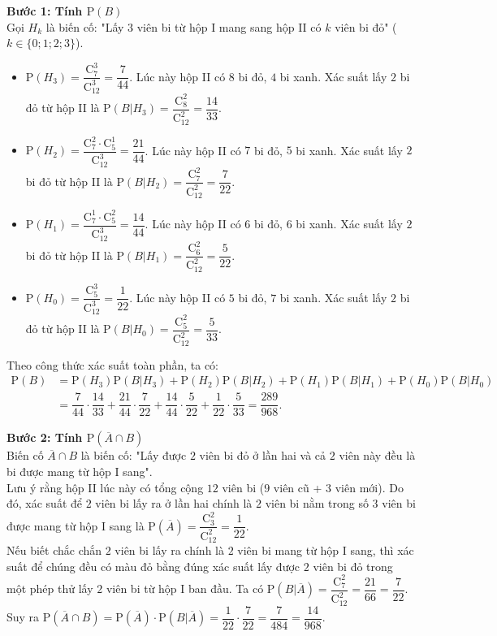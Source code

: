 \begin{ex}
{		\noindent\textbf{Bước 1: Tính $\mathrm{P}(B)$}\\
		Gọi $H_k$ là biến cố: "Lấy $3$ viên bi từ hộp I mang sang hộp II có $k$ viên bi đỏ" ($k \in \{0; 1; 2; 3\}$).
		\begin{itemize}
			\item $\mathrm{P}(H_3) = \dfrac{\mathrm{C}_7^3}{\mathrm{C}_{12}^3} = \dfrac{7}{44}$. Lúc này hộp II có $8$ bi đỏ, $4$ bi xanh. Xác suất lấy $2$ bi đỏ từ hộp II là $\mathrm{P}(B|H_3) = \dfrac{\mathrm{C}_8^2}{\mathrm{C}_{12}^2} = \dfrac{14}{33}$.
			\item $\mathrm{P}(H_2) = \dfrac{\mathrm{C}_7^2 \cdot \mathrm{C}_5^1}{\mathrm{C}_{12}^3} = \dfrac{21}{44}$. Lúc này hộp II có $7$ bi đỏ, $5$ bi xanh. Xác suất lấy $2$ bi đỏ từ hộp II là $\mathrm{P}(B|H_2) = \dfrac{\mathrm{C}_7^2}{\mathrm{C}_{12}^2} = \dfrac{7}{22}$.
			\item $\mathrm{P}(H_1) = \dfrac{\mathrm{C}_7^1 \cdot \mathrm{C}_5^2}{\mathrm{C}_{12}^3} = \dfrac{14}{44}$. Lúc này hộp II có $6$ bi đỏ, $6$ bi xanh. Xác suất lấy $2$ bi đỏ từ hộp II là $\mathrm{P}(B|H_1) = \dfrac{\mathrm{C}_6^2}{\mathrm{C}_{12}^2} = \dfrac{5}{22}$.
			\item $\mathrm{P}(H_0) = \dfrac{\mathrm{C}_5^3}{\mathrm{C}_{12}^3} = \dfrac{1}{22}$. Lúc này hộp II có $5$ bi đỏ, $7$ bi xanh. Xác suất lấy $2$ bi đỏ từ hộp II là $\mathrm{P}(B|H_0) = \dfrac{\mathrm{C}_5^2}{\mathrm{C}_{12}^2} = \dfrac{5}{33}$.
		\end{itemize}
		Theo công thức xác suất toàn phần, ta có:
		\allowdisplaybreaks
		\begin{align*}
			\mathrm{P}(B) &= \mathrm{P}(H_3)\mathrm{P}(B|H_3) + \mathrm{P}(H_2)\mathrm{P}(B|H_2) + \mathrm{P}(H_1)\mathrm{P}(B|H_1) + \mathrm{P}(H_0)\mathrm{P}(B|H_0) \\
			&= \dfrac{7}{44} \cdot \dfrac{14}{33} + \dfrac{21}{44} \cdot \dfrac{7}{22} + \dfrac{14}{44} \cdot \dfrac{5}{22} + \dfrac{1}{22} \cdot \dfrac{5}{33} = \dfrac{289}{968}.
		\end{align*}
		
		\noindent\textbf{Bước 2: Tính $\mathrm{P}(\overline{A} \cap B)$}\\
		Biến cố $\overline{A} \cap B$ là biến cố: "Lấy được $2$ viên bi đỏ ở lần hai và cả $2$ viên này đều là bi được mang từ hộp I sang".\\
		Lưu ý rằng hộp II lúc này có tổng cộng $12$ viên bi ($9$ viên cũ + $3$ viên mới). Do đó, xác suất để $2$ viên bi lấy ra ở lần hai chính là $2$ viên bi nằm trong số $3$ viên bi được mang từ hộp I sang là $\mathrm{P}(\overline{A}) = \dfrac{\mathrm{C}_3^2}{\mathrm{C}_{12}^2} = \dfrac{1}{22}$.\\
		Nếu biết chắc chắn $2$ viên bi lấy ra chính là $2$ viên bi mang từ hộp I sang, thì xác suất để chúng đều có màu đỏ bằng đúng xác suất lấy được $2$ viên bi đỏ trong một phép thử lấy $2$ viên bi từ hộp I ban đầu. Ta có $\mathrm{P}(B|\overline{A}) = \dfrac{\mathrm{C}_7^2}{\mathrm{C}_{12}^2} = \dfrac{21}{66} = \dfrac{7}{22}$.\\
		Suy ra $\mathrm{P}(\overline{A} \cap B) = \mathrm{P}(\overline{A}) \cdot \mathrm{P}(B|\overline{A}) = \dfrac{1}{22} \cdot \dfrac{7}{22} = \dfrac{7}{484} = \dfrac{14}{968}$.\\
		
}
\end{ex}
